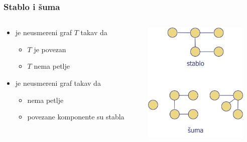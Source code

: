 \documentclass[compress]{beamer}
\begin{document}
\begin{frame}[fragile]
  \frametitle{Stablo i šuma}
  \begin{columns}
    \begin{column}[t]{6cm}
      \begin{itemize}
        \item {} je neusmereni graf $T$ takav da
        \begin{itemize}
          \item $T$ je povezan
          \item $T$ nema petlje
        \end{itemize}
        \item {} je neusmereni graf takav da
        \begin{itemize}
          \item nema petlje
          \item povezane komponente su stabla
        \end{itemize}
      \end{itemize}
    \end{column}
    \begin{column}[t]{6cm}
      \begin{center}
        \includegraphics[width=5cm]{asp-14-pic16.png}
      \end{center}
    \end{column}
  \end{columns}
\end{frame}
\end{document}

